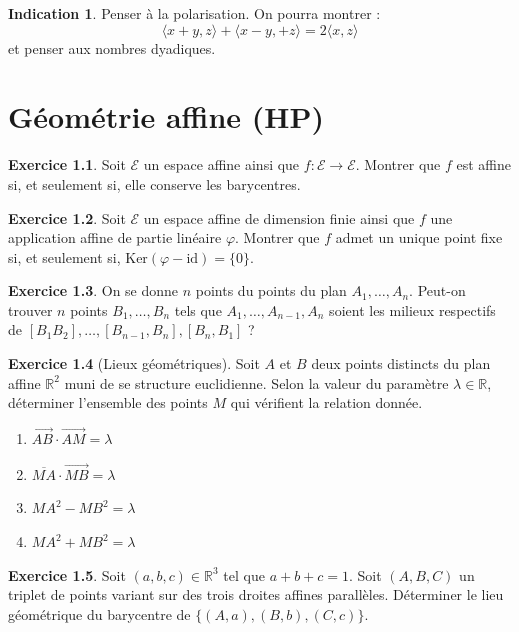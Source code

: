 \documentclass[french]{book}
\newcommand{\R}{\mathbb{R}}
\renewcommand{\ker}{\text{Ker}}
\newcommand{\id}{\text{id}}
\theoremstyle{definition}
\newtheorem{ex}{Exercice}[chapter]
\theoremstyle{theorem}
\newtheorem*{ind}{Indication}
\theoremstyle{remark}
\begin{document}
\begin{ind}
	Penser à la polarisation. On pourra montrer : $$\langle x+y,z\rangle+\langle x-y,+z\rangle=2\langle x,z\rangle$$ et penser aux nombres dyadiques.
\end{ind}

\chapter{Géométrie affine (HP)}

\begin{ex}
	Soit $\mathcal{E}$ un espace affine ainsi que $f:\mathcal{E}\to\mathcal{E}$. Montrer que $f$ est affine si, et seulement si, elle conserve les barycentres.
\end{ex}

\begin{ex}
	Soit $\mathcal{E}$ un espace affine de dimension finie ainsi que $f$ une application affine de partie linéaire $\varphi$. Montrer que $f$ admet un unique point fixe si, et seulement si, $\ker(\varphi-\id)=\{0\}$.
\end{ex}

\begin{ex}
	On se donne $n$ points du points du plan $A_1,\ldots,A_n$. Peut-on trouver $n$ points $B_1,\ldots,B_n$ tels que $A_1,\ldots,A_{n-1},A_n$ soient les milieux respectifs de $[B_1B_2],\ldots,[B_{n-1},B_n],[B_n,B_1]$ ?
\end{ex}

\begin{ex}[Lieux géométriques]
	Soit $A$ et $B$ deux points  distincts du plan affine $\R^2$ muni de se structure euclidienne. Selon la valeur du paramètre $\lambda\in\R$, déterminer l'ensemble des points $M$ qui vérifient la relation donnée.
	\begin{enumerate}
		\item $\overrightarrow{AB}\cdot\overrightarrow{AM}=\lambda$
		\item $\overline{MA}\cdot\overrightarrow{MB}=\lambda$
		\item $MA^2-MB^2=\lambda$
		\item $MA^2+MB^2=\lambda$
	\end{enumerate}
\end{ex}

\begin{ex}
	Soit $(a,b,c)\in\R^3$ tel que $a+b+c=1$. Soit $(A,B,C)$ un triplet de points variant sur des trois droites affines parallèles. Déterminer le lieu géométrique du barycentre de $\{(A,a),(B,b),(C,c)\}$.
\end{ex}
\end{document}
